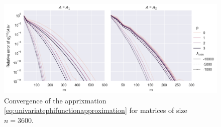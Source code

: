 \begin{figure}[h!]
    \centering
    \includegraphics[width=.9\textwidth]{img/krylovapproximation/cnvg_ps_PA_3600.png}
    \caption{Convergence of the apprixmation \eqref{eq:univariatephifunctionapproximation} for matrices of size $n=3600$.}
    \label{fig:polynomialkrylovapproximationevaluation}
\end{figure}



